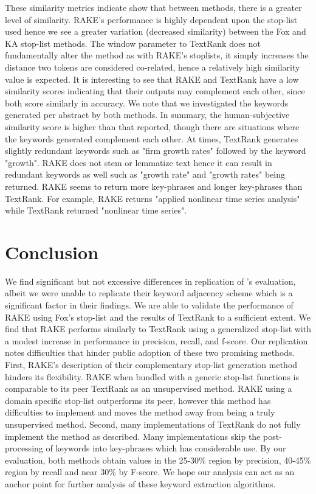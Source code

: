 \documentclass[11pt,a4paper]{article}
\begin{document}
These similarity metrics indicate show that between methods, there is a greater level of similarity. RAKE's performance is highly dependent upon the stop-list used hence we see a greater variation (decreased similarity) between the Fox and KA stop-list methods. The window parameter to TextRank does not fundamentally alter the method as with RAKE's stoplists, it simply increases the distance two tokens are considered co-related, hence a relatively high similarity value is expected. It is interesting to see that  RAKE and TextRank have a low similarity scores indicating that their outputs may complement each other, since both score similarly in accuracy. We note that we investigated the keywords generated per abstract by both methods. In summary, the human-subjective similarity score is higher than that reported, though there are situations where the keywords generated complement each other. At times, TextRank generates slightly redundant keywords such as "firm growth rates" followed by the keyword "growth".  RAKE does not stem or lemmatize text hence it can result in redundant keywords as well such as "growth rate" and "growth rates" being returned. RAKE seems to return more key-phrases and longer key-phrases than TextRank. For example, RAKE returns "applied nonlinear time series analysis" while TextRank returned "nonlinear time series".

\section{Conclusion}

We find significant but not excessive differences in replication of \citet{1}'s evaluation, albeit we were unable to replicate their keyword adjacency scheme which is a significant factor in their findings. We are able to validate the performance of RAKE using Fox's stop-list and the results of TextRank to a sufficient extent. We find that RAKE performs similarly to TextRank using a generalized stop-list with a modest increase in performance in precision, recall, and f-score. Our replication notes difficulties that hinder public adoption of these two promising methods. First, RAKE's description of their complementary stop-list generation method hinders its flexibility. RAKE when bundled with a generic stop-list functions is comparable to its peer TextRank as an unsupervised method. RAKE using a domain specific stop-list outperforms its peer, however this method has difficulties to implement and moves the method away from being a truly unsupervised method. Second, many implementations of TextRank do not fully implement the method as described. Many implementations skip the post-processing of keywords into key-phrases which has considerable use. By our evaluation, both methods obtain values in the 25-30\% region by precision, 40-45\% region by recall and near 30\% by F-score. We hope our analysis can act as an anchor point for further analysis of these keyword extraction algorithms. 
\end{document}

